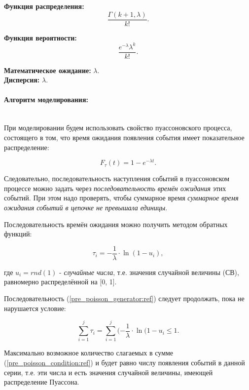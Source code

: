 \textbf{Функция распределения:}
\begin{equation}
	\frac{\Gamma (k+1,\lambda)}{k!}.
\end{equation}

\textbf{Функция вероятности:}
\begin{equation}
	\frac{e^{-\lambda}\lambda^{k}}{k!}.
\end{equation}

\textbf{Математическое ожидание:} $\lambda$.\\

\textbf{Дисперсия:} $\lambda$.

\paragraph{Алгоритм моделирования:}\
\\

При моделировании будем использовать свойство пуассоновского процесса, состоящего в том, что
время ожидания появления события имеет показательное распределение:

\begin{equation}
	F_{\tau}(t) = 1 - e^{-\lambda t}.
\end{equation}

Следовательно, последовательность наступления событий в пуассоновском процессе можно задать через \textit{последовательность времён ожидания} этих событий. При этом надо проверять, чтобы суммарное время \textit{суммарное время ожидания событий в цепочке не превышала единицы}.

Последовательность времён ожидания можно получить методом обратных функций:

\begin{equation}
	\tau_{i} = - \frac{1}{\lambda} \cdot \ln(1-u_{i}),
	\label{pre_poisson_generator:ref}
\end{equation}

где $u_{i} = rnd(1)$ - \textit{случайные числа}, т.е. значения случайной величины (СВ), равномерно распределённой на [0, 1].

Последовательность (\ref{pre_poisson_generator:ref}) следует продолжать, пока не нарушается условие:

\begin{equation}
	\sum_{i=1}^{j}\tau_{i} = \sum_{i=1}^{j}(-\frac{1}{\lambda} \cdot \ln(1-u_{i} \leqslant 1.
	\label{pre_poisson_condition:ref}
\end{equation}

Максимально возможное количество слагаемых в сумме (\ref{pre_poisson_condition:ref}) и будет равно числу появления событий в данной серии, т.е. эти числа и есть значения случайной величины, имеющей распределение Пуассона.

